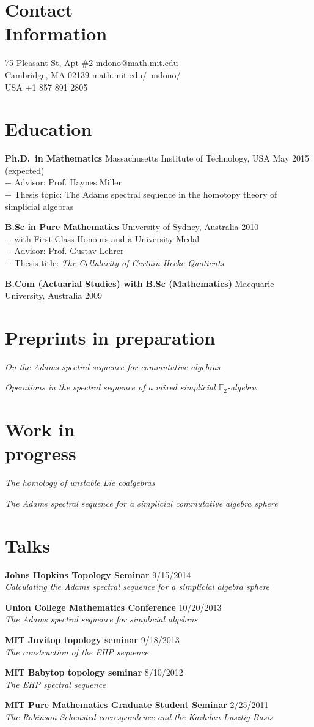 \documentclass[margin,line]{resume}
\newcommand{\CVsection}[1]{\section{\mysidestyle #1}}
\newcommand{\entry}[3]{\textbf{#1} #2 \hfill {#3}
           
\vspace{-2.7mm}}
\newcommand{\twolineentry}[4]{\textbf{#1} #2 \hfill {#4}\\%
#3
           
\vspace{-2.7mm}}
\newcommand{\FINALentry}[3]{\textbf{#1} #2 \hfill {#3}}
\newcommand{\FINALtwolineentry}[4]{\textbf{#1} #2 \hfill {#4}\\%
#3}
\begin{document}
\begin{resume}

\CVsection{Contact\\Information}

75 Pleasant St, Apt \#2 \hfill {mdono@math.mit.edu}\\
Cambridge, MA  02139 \hfill {math.mit.edu/~mdono/}\\
USA \hfill +1 857 891 2805





\CVsection{Education}

\twolineentry{Ph.D.\ in Mathematics}{Massachusetts Institute of Technology, USA}{%
\phantom{space}$-$ Advisor: Prof. Haynes Miller\\
\phantom{space}$-$ Thesis topic: The Adams spectral sequence in the homotopy theory of simplicial algebras%
}{May 2015 (expected)}
\twolineentry{B.Sc in Pure Mathematics}{University of Sydney, Australia}{%
\phantom{space}$-$ with First Class Honours and a University Medal\\
\phantom{space}$-$ Advisor: Prof. Gustav Lehrer\\
\phantom{space}$-$ Thesis title: \emph{The Cellularity of Certain Hecke Quotients}
}{2010}
\FINALentry{B.Com (Actuarial Studies) with B.Sc (Mathematics)}{Macquarie University, Australia}{2009}


\CVsection{Preprints in preparation}

\entry{\hspace{-.275em}}{\emph{On the Adams spectral sequence for commutative algebras}}{}
\FINALentry{\hspace{-.275em}}{\emph{Operations in the spectral sequence of a mixed simplicial $\mathbb{F}_2$-algebra}}{}


\CVsection{Work in \\progress}

\entry{\hspace{-.275em}}{\emph{The homology of unstable Lie coalgebras}}{}
\FINALentry{\hspace{-.275em}}{\emph{The Adams spectral sequence for a simplicial commutative algebra
sphere}}{}


\CVsection{Talks}

\twolineentry{Johns Hopkins Topology Seminar}{}{\emph{Calculating the Adams spectral sequence for a simplicial algebra sphere}}{9/15/2014}
\twolineentry{Union College Mathematics Conference}{}{\emph{The Adams spectral sequence for simplicial algebras}}{10/20/2013}
\twolineentry{MIT Juvitop topology seminar}{}{\emph{The construction of the EHP sequence}}{9/18/2013}
\twolineentry{MIT Babytop topology seminar}{}{\emph{The EHP spectral sequence}}{8/10/2012}
\FINALtwolineentry{MIT Pure Mathematics Graduate Student Seminar}{}{\emph{The Robinson-Schensted correspondence and the Kazhdan-Lusztig Basis}}{2/25/2011}



\end{resume}
\end{document}
